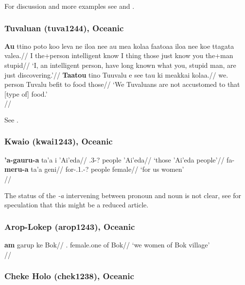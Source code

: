 For discussion and more examples see \citealp[368, 373]{bauer1993} and \citealp[262f.]{bauer1997}.

\subsubsection{Tuvaluan (tuva1244), Oceanic}

\pex \a
\begingl
\gla \textbf{Au} ttino poto koo leva ne iloa nee au mea kolaa faatoaa iloa nee koe ttagata valea.//
\glb I the+person intelligent \Pfv{} {} {} know \Erg{} I thing those just know \Erg{} you the+man stupid//
\glft `I, an intelligent person, have long known what you, stupid man, are just discovering.'//
\endgl
\a\begingl
\gla \textbf{Taatou} tino Tuuvalu e see tau ki meakkai kolaa.//
\glb we.\Incl{} person Tuvalu \Npst{} \Neg{} befit to food those//
\glft `We Tuvaluans are not accustomed to that [type of] food.'\\\citep[393, (2018/2019)]{besnier2000}//
\endgl
\xe

See \citealp[392f.]{besnier2000}.

\subsubsection{Kwaio (kwai1243), Oceanic}

\pex
\a \begingl
\gla \textbf{'a-gauru-a} ta'a i 'Ai'eda//
\glb  \Fpron.3\Tri-? people \Loc{} 'Ai'eda//
\glft `those 'Ai'eda people'//
\endgl
\a
\begingl
\gla fa-\textbf{meru-a} ta'a geni//
\glb for-\Spron.1\Tri.\Excl-? people female//
\glft `for us women' \\\citep[after][104]{keesing1985}//
\endgl
\xe

The status of the \emph{-a} intervening between pronoun and noun is not clear, see \citet[25]{hoehn2020ThirdGap} for speculation that this might be a reduced article.

\subsubsection{Arop-Lokep (arop1243), Oceanic}

\ex
\begingl
\gla \textbf{am} garup ke Bok//
\Excl.\Pl{} female.one of Bok//
\glft `we women of Bok village'\\\citep[255]{djernes2002}//
\endgl
\xe


\subsubsection{Cheke Holo (chek1238), Oceanic}

